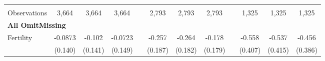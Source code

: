 \begin{landscape}
\begin{table}[htpb!]
\begin{center}
\begin{tabular}{lcccp{2mm}cccp{2mm}ccc}
\begin{footnotesize}\end{footnotesize}&\begin{footnotesize}\end{footnotesize}&\begin{footnotesize}\end{footnotesize}&\begin{footnotesize}\end{footnotesize}&\begin{footnotesize}\end{footnotesize}&\begin{footnotesize}\end{footnotesize}&\begin{footnotesize}\end{footnotesize}&\begin{footnotesize}\end{footnotesize}&\begin{footnotesize}\end{footnotesize}&\begin{footnotesize}\end{footnotesize}&\begin{footnotesize}\end{footnotesize}&\begin{footnotesize}\end{footnotesize}\\Observations&3,664&3,664&3,664&&2,793&2,793&2,793&&1,325&1,325&1,325\\
\multicolumn{12}{l}{\textbf{All OmitMissing}}\\ 
Fertility&-0.0873&-0.102&-0.0723&&-0.257&-0.264&-0.178&&-0.558&-0.537&-0.456\\
&(0.140)&(0.141)&(0.149)&&(0.187)&(0.182)&(0.179)&&(0.407)&(0.415)&(0.386)\\

\end{tabular}
\end{center}
\end{table}
\end{landscape}
